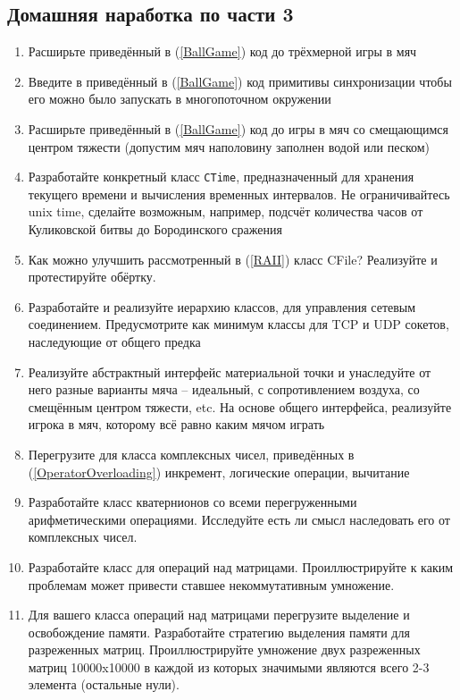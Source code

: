 \documentclass[a4paper,12pt,oneside]{article}
\begin{document}
\pagebreak
\subsection{Домашняя наработка по части 3}

\begin{enumerate}
\item
Расширьте приведённый в (\ref{BallGame}) код до трёхмерной игры в мяч

\item
Введите в приведённый в (\ref{BallGame}) код примитивы синхронизации чтобы его можно было запускать в многопоточном окружении

\item
Расширьте приведённый в (\ref{BallGame}) код до игры в мяч со смещающимся центром тяжести (допустим мяч наполовину заполнен водой или песком)

\item
Разработайте конкретный класс \lstinline!CTime!, предназначенный для хранения текущего времени и вычисления временных интервалов. Не ограничивайтесь unix time, сделайте возможным, например, подсчёт количества часов от Куликовской битвы до Бородинского сражения

\item
Как можно улучшить рассмотренный в (\ref{RAII}) класс CFile? Реализуйте и протестируйте обёртку.

\item
Разработайте и реализуйте иерархию классов, для управления сетевым соединением. Предусмотрите как минимум классы для TCP и UDP сокетов, наследующие от общего предка

\item
Реализуйте абстрактный интерфейс материальной точки и унаследуйте от него разные варианты мяча -- идеальный, с сопротивлением воздуха, со смещённым центром тяжести, etc. На основе общего интерфейса, реализуйте игрока в мяч, которому всё равно каким мячом играть

\item
Перегрузите для класса комплексных чисел, приведённых в (\ref{OperatorOverloading}) инкремент, логические операции, вычитание

\item
Разработайте класс кватернионов со всеми перегруженными арифметическими операциями. Исследуйте есть ли смысл наследовать его от комплексных чисел.

\item
Разработайте класс для операций над матрицами. Проиллюстрируйте к каким проблемам может привести ставшее некоммутативным умножение.

\item
Для вашего класса операций над матрицами перегрузите выделение и освобождение памяти. Разработайте стратегию выделения памяти для разреженных матриц. Проиллюстрируйте умножение двух разреженных матриц 10000x10000 в каждой из которых значимыми являются всего 2-3 элемента (остальные нули).

\end{enumerate}
\end{document}
